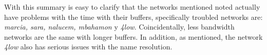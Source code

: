 With this summary is easy to clarify that the networks mentioned noted
actually have problems with the time with their buffers, specifically troubled
networks are: \textit{marcia, sara, nalucem, mbahamon} y \textit{4low}.
Coincidentally, less bandwidth networks are the same with longer buffers. In
addition, as mentioned, the network \textit{4low} also has serious issues
with the name resolution.



